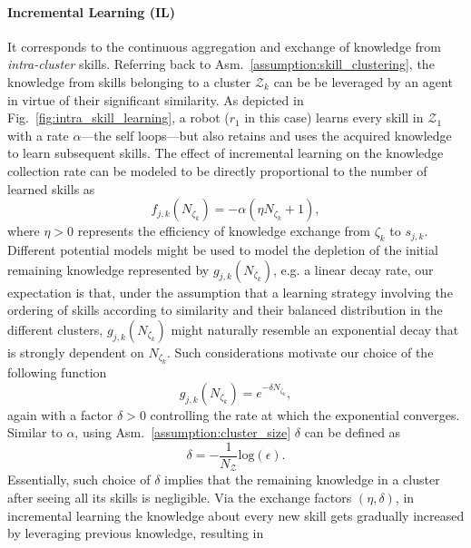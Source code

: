 \paragraph{\textbf{Incremental Learning (IL)}}
It corresponds to the continuous aggregation and exchange of knowledge from \emph{intra-cluster} skills. Referring back to Asm.~\ref{assumption:skill_clustering}, the knowledge from skills belonging to a cluster ${\mathcal{Z}_k}$ can be be leveraged by an agent in virtue of their significant similarity. As depicted in Fig.~\ref{fig:intra_skill_learning}, a robot ($r_1$ in this case) learns every skill in $\mathcal{Z}_1$ with a rate $\alpha$---the self loops---but also retains and uses the acquired knowledge to learn subsequent skills. The effect of incremental learning on the knowledge collection rate can be modeled to be directly proportional to the number of learned skills as
\begin{equation}\label{eq:f_function_incremental}
	f_{j,k}\left(N_{\zeta_k}\right) = -\alpha\left(\eta N_{\zeta_k} + 1 \right), 
\end{equation}
where $\eta>0$ represents the efficiency of knowledge exchange from $\zeta_k$ to $s_{j,k}$. Different potential models might be used to model the depletion of the initial remaining knowledge represented by $g_{j,k}\left(N_{\zeta_k}\right)$, e.g. a linear decay rate, our expectation is that, under the assumption that a learning strategy involving the ordering of skills according to similarity and their balanced distribution in the different clusters, $g_{j,k}\left(N_{\zeta_k}\right)$ might naturally resemble an exponential decay that is strongly dependent on $N_{\zeta_k}$. Such considerations motivate our choice of the following function
\begin{equation}\label{eq:g_function_incremental}
	g_{j,k}\left(N_{\zeta_k}\right) = e^{-\delta N_{\zeta_k}},
\end{equation}
again with a factor $\delta>0$ controlling the rate at which the exponential converges. Similar to $\alpha$, using Asm.~\ref{assumption:cluster_size} $\delta$ can be defined as 
\begin{equation}\label{eq:delta}
	\delta = -\frac{1}{N_\mathcal{Z}}\text{log}(\epsilon).
\end{equation}
Essentially, such choice of $\delta$ implies that the remaining knowledge in a cluster after seeing all its skills is negligible. Via the exchange factors $(\eta,\delta)$, in incremental learning the knowledge about every new skill gets gradually increased by leveraging previous knowledge, resulting in

